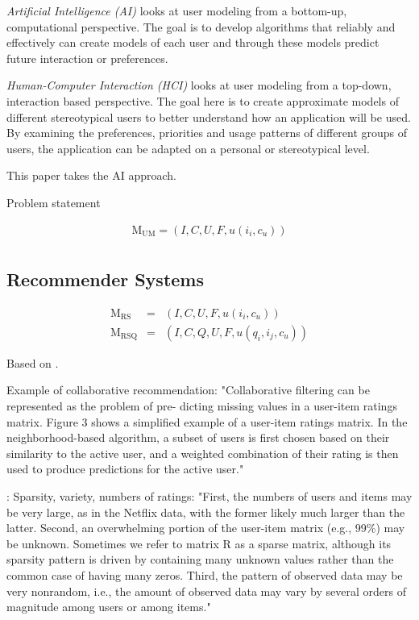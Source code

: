 \emph{Artificial Intelligence (AI)} looks at user modeling from a bottom-up, computational perspective. 
The goal is to develop algorithms that reliably and effectively can create models of each user
and through these models predict future interaction or preferences. 

\emph{Human-Computer Interaction (HCI)} looks at user modeling from a top-down, interaction based perspective.
The goal here is to create approximate models of different stereotypical users to better understand how 
an application will be used. By examining the preferences, priorities and usage patterns of different groups
of users, the application can be adapted on a personal or stereotypical level.

This paper takes the AI approach.

Problem statement

\begin{eqnarray}
  \mathrm{M_{UM}} = (I, C, U, F, u(i_i, c_u))\\
\end{eqnarray}

\subsection{Recommender Systems}

\begin{eqnarray}
  \mathrm{M_{RS}}   &=& (I, C, U, F,    u(i_i, c_u))\\
  \mathrm{M_{RSQ}}  &=& (I, C, Q, U, F, u(q_i, i_j, c_u))
\end{eqnarray}

Based on \cite[p2]{Adomavicius2005}.


\cite[p5]{Sugiyama2004} Example of collaborative recommendation: 
"Collaborative filtering can be represented as the problem of pre- dicting missing values in a user-item ratings matrix. Figure 3 shows a simplified example of a user-item ratings matrix.
In the neighborhood-based algorithm, a subset of users is first chosen based on their similarity to the active user, and a weighted combination of their rating is then used to produce predictions for the active user."

\cite[p2]{Bell2007b}: Sparsity, variety, numbers of ratings:
"First, the numbers of users and items may be very large, as in the Netflix data, with the former likely much larger than the latter.
Second, an overwhelming portion of the user-item matrix (e.g., 99\%) may be unknown. Sometimes we refer to matrix R as a sparse matrix, although its sparsity pattern is driven by containing many unknown values rather than the common case of having many zeros.
Third, the pattern of observed data may be very nonrandom, i.e., the amount of observed data may vary by several orders of magnitude among users or among items."

